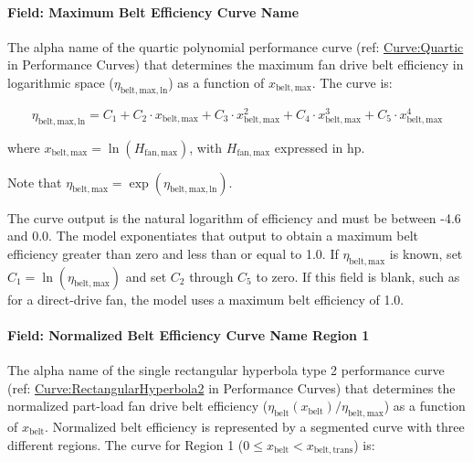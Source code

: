 \paragraph{Field: Maximum Belt Efficiency Curve Name}\label{field-maximum-belt-efficiency-curve-name}

The alpha name of the quartic polynomial performance curve (ref: \hyperref[curvequartic]{Curve:Quartic} in Performance Curves) that determines the maximum fan drive belt efficiency in logarithmic space (\(\eta_{\mathrm{belt, max, ln}}\)) as a function of \(x_{\mathrm{belt, max}}\). The curve is:

\begin{equation}
\eta_{\mathrm{belt, max, ln}} = C_1 + C_2 \cdot x_{\mathrm{belt, max}} + C_3 \cdot x_{\mathrm{belt, max}}^2 + C_4 \cdot x_{\mathrm{belt, max}}^3 + C_5 \cdot x_{\mathrm{belt, max}}^4
\end{equation}

where \(x_{\mathrm{belt,max}} = \ln(H_{\mathrm{fan,max}})\), with \(H_{\mathrm{fan,max}}\) expressed in hp.

Note that \(\eta_{\mathrm{belt,max}} = \exp(\eta_{\mathrm{belt,max,ln}})\).

The curve output is the natural logarithm of efficiency and must be between -4.6 and 0.0. The model exponentiates that output to obtain a maximum belt efficiency greater than zero and less than or equal to 1.0. If \(\eta_{\mathrm{belt,max}}\) is known, set \(C_1 = \ln(\eta_{\mathrm{belt,max}})\) and set \(C_2\) through \(C_5\) to zero. If this field is blank, such as for a direct-drive fan, the model uses a maximum belt efficiency of 1.0.

\paragraph{Field: Normalized Belt Efficiency Curve Name Region 1}\label{field-normalized-belt-efficiency-curve-name-region-1}

The alpha name of the single rectangular hyperbola type 2 performance curve (ref: \hyperref[curverectangularhyperbola2]{Curve:RectangularHyperbola2} in Performance Curves) that determines the normalized part-load fan drive belt efficiency (\(\eta_{\mathrm{belt}}(x_{\mathrm{belt}}) / \eta_{\mathrm{belt, max}}\)) as a function of \(x_{\mathrm{belt}}\). Normalized belt efficiency is represented by a segmented curve with three different regions. The curve for Region 1 (\(0 \le x_{\mathrm{belt}} < x_{\mathrm{belt, trans}}\)) is:

